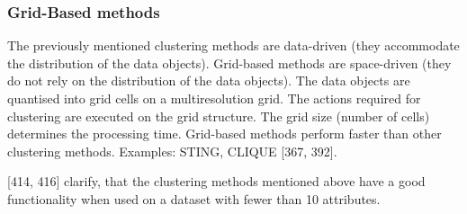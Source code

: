 \subsubsection{Grid-Based methods}
The previously mentioned clustering methods are data-driven (they accommodate the distribution of the data objects). Grid-based methods are space-driven (they do not rely on the distribution of the data objects). The data objects are quantised into grid cells on a multiresolution grid. The actions required for clustering are executed on the grid structure. The grid size (number of cells) determines the processing time. Grid-based methods perform faster than other clustering methods. Examples: STING, CLIQUE \autocite{han2011data}[367, 392].



\vspace{5mm} %
\textcite{han2011data}[414, 416] clarify, that the clustering methods mentioned above have a good functionality when used on a dataset with fewer than 10 attributes. 
